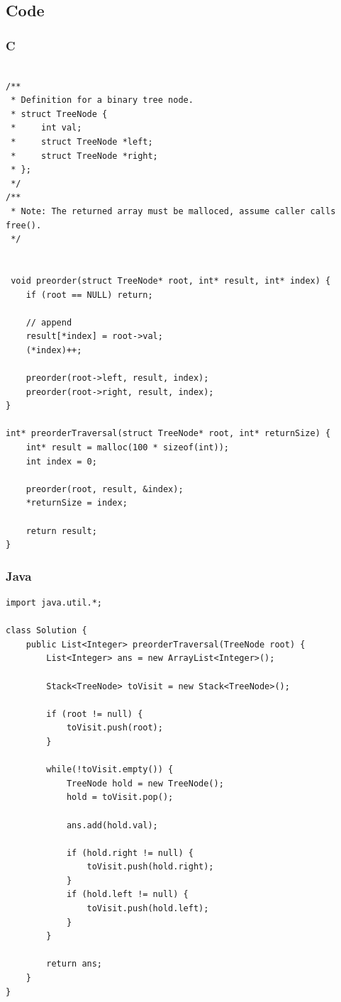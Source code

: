 \documentclass[11pt]{article}
\begin{document}
\subsection{Code}
\subsubsection{C}

\begin{verbatim}

/**
 * Definition for a binary tree node.
 * struct TreeNode {
 *     int val;
 *     struct TreeNode *left;
 *     struct TreeNode *right;
 * };
 */
/**
 * Note: The returned array must be malloced, assume caller calls free().
 */


 void preorder(struct TreeNode* root, int* result, int* index) {
    if (root == NULL) return;

    // append
    result[*index] = root->val;
    (*index)++;

    preorder(root->left, result, index);
    preorder(root->right, result, index);
}

int* preorderTraversal(struct TreeNode* root, int* returnSize) {
    int* result = malloc(100 * sizeof(int));
    int index = 0;

    preorder(root, result, &index);
    *returnSize = index;

    return result;
}

\end{verbatim}


\subsubsection{Java}

\begin{verbatim}
import java.util.*;

class Solution {
    public List<Integer> preorderTraversal(TreeNode root) {
        List<Integer> ans = new ArrayList<Integer>();

        Stack<TreeNode> toVisit = new Stack<TreeNode>();

        if (root != null) {
            toVisit.push(root);
        }

        while(!toVisit.empty()) {
            TreeNode hold = new TreeNode();
            hold = toVisit.pop();

            ans.add(hold.val);

            if (hold.right != null) {
                toVisit.push(hold.right);
            }
            if (hold.left != null) {
                toVisit.push(hold.left);
            }
        }

        return ans;
    }
}
\end{verbatim}
\end{document}
